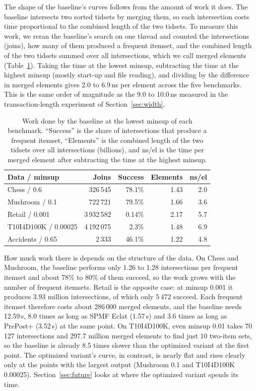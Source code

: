 The shape of the baseline's curves follows from the amount of work it does. The baseline
intersects two sorted tidsets by merging them, so each intersection costs time
proportional to the combined length of the two tidsets. To measure this work, we reran the
baseline's search on one thread and counted the intersections (joins), how many of them
produced a frequent itemset, and the combined length of the two tidsets summed over all
intersections, which we call merged elements (Table~\ref{tab:join-work}). Taking the time
at the lowest minsup, subtracting the time at the highest minsup (mostly start-up and file
reading), and dividing by the difference in merged elements gives 2.0 to 6.9\,ns per
element across the five benchmarks. This is the same order of magnitude as the 9.0 to
10.0\,ns measured in the transaction-length experiment of Section~\ref{sec:width}.

\begin{table}[t]
\centering
\small
\setlength{\tabcolsep}{3pt}
\caption{Work done by the baseline at the lowest minsup of each benchmark. ``Success'' is
the share of intersections that produce a frequent itemset, ``Elements'' is the combined
length of the two tidsets over all intersections (billions), and ns/el is the time per
merged element after subtracting the time at the highest minsup.}
\label{tab:join-work}
\begin{tabular}{lrrrr}
\hline
Data / minsup & Joins & Success & Elements & ns/el \\
\hline
Chess / 0.6 & 326\,545 & 78.1\% & 1.43 & 2.0 \\
Mushroom / 0.1 & 722\,721 & 79.5\% & 1.66 & 3.6 \\
Retail / 0.001 & 3\,932\,582 & 0.14\% & 2.17 & 5.7 \\
T10I4D100K / 0.00025 & 4\,192\,075 & 2.3\% & 1.48 & 6.9 \\
Accidents / 0.65 & 2\,333 & 46.1\% & 1.22 & 4.8 \\
\hline
\end{tabular}
\end{table}

How much work there is depends on the structure of the data. On Chess and Mushroom, the
baseline performs only 1.26 to 1.28 intersections per frequent itemset and about 78\% to
80\% of them succeed, so the work grows with the number of frequent itemsets. Retail is
the opposite case: at minsup 0.001 it produces 3.93 million intersections, of which only
5\,472 succeed. Each frequent itemset therefore costs about 286\,000 merged elements, and
the baseline needs 12.59\,s, 8.0 times as long as SPMF Eclat (1.57\,s) and 3.6 times as
long as PrePost+ (3.52\,s) at the same point. On T10I4D100K, even minsup 0.01 takes 70\,127
intersections and 297.7 million merged elements to find just 10 two-item sets, so the
baseline is already 8.5 times slower than the optimized variant at the first point. The
optimized variant's curve, in contrast, is nearly flat and rises clearly only at the
points with the largest output (Mushroom 0.1 and T10I4D100K 0.00025).
Section~\ref{sec:future} looks at where the optimized variant spends its time.

